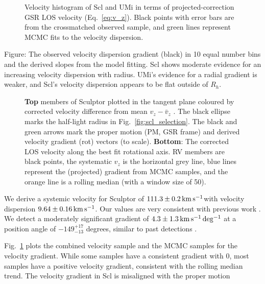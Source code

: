 \begin{figure}
\centering
{}
\caption[LOS velocity fit to Scl]{Velocity histogram of Scl and UMi in
terms of projected-correction GSR LOS velocity (Eq.~\ref{eq:v_z}). Black
points with error bars are from the crossmatched observed sample, and
green lines represent MCMC fits to the velocity dispersion.}
\end{figure}

Figure: The observed velocity dispersion gradient (black) in 10 equal
number bins and the derived slopes from the model fitting. Scl shows
moderate evidence for an increasing velocity dispersion with radius.
UMi's evidence for a radial gradient is weaker, and Scl's velocity
dispersion appears to be flat outside of \(R_h\).



\begin{figure}
\centering
{}
\caption[Scl velocity gradient]{\textbf{Top} members of Sculptor plotted
in the tangent plane coloured by corrected velocity difference from mean
\(v_z - \bar v_z\) . The black ellipse marks the half-light radius in
Fig.~\ref{fig:scl_selection}. The black and green arrows mark the proper
motion (PM, GSR frame) and derived velocity gradient (rot) vectors (to
scale). \textbf{Bottom}: The corrected LOS velocity along the best fit
rotational axis. RV members are black points, the systematic \(v_z\) is
the horizontal grey line, blue lines represent the (projected) gradient
from MCMC samples, and the orange line is a rolling median (with a
window size of 50).}\label{fig:scl_velocity_gradient_scatter}
\end{figure}

We derive a systemic velocity for Sculptor of \(111.3\pm0.2\,{\rm km\,s^{-1}}\)with
velocity dispersion \(9.64\pm0.16\,{\rm km\,s^{-1}}\). Our values are very
consistent with previous work \citep[e.g.][\citet{arroyo-polonio+2024},
\citet{battaglia+2008}]{walker+2009}. We detect a moderately significant
gradient of \(4.3\pm1.3\,{\rm km\,s^{-1}\,deg^{-1}}\) at a position angle of
\(-149_{-13}^{+17}\) degrees, similar to past detections
\citetext{\citealp[e.g.,][]{arroyo-polonio+2024}; \citealp{battaglia+2008}; \citealp[but
see also][]{strigari2010}; \citealp{martinez-garcia+2023}}.

Fig.~\ref{fig:scl_velocity_gradient_scatter} plots the combined velocity
sample and the MCMC samples for the velocity gradient. While some
samples have a consistent gradient with 0, most samples have a positive
velocity gradient, consistent with the rolling median trend. The
velocity gradient in Scl is misaligned with the proper motion

